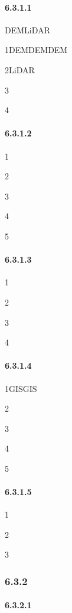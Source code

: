 \hypertarget{section-64}{%
\paragraph{6.3.1.1}\label{section-64}}

DEMLiDAR

1DEMDEMDEM

2LiDAR

3

4

\hypertarget{section-65}{%
\paragraph{6.3.1.2}\label{section-65}}

1

2

3

4

5

\hypertarget{section-66}{%
\paragraph{6.3.1.3}\label{section-66}}

1

2

3

4

\hypertarget{section-67}{%
\paragraph{6.3.1.4}\label{section-67}}

1GISGIS

2

3

4

5

\hypertarget{section-68}{%
\paragraph{6.3.1.5}\label{section-68}}

1

2

3

\hypertarget{section-69}{%
\subsubsection{6.3.2}\label{section-69}}

\hypertarget{section-70}{%
\paragraph{6.3.2.1}\label{section-70}}

